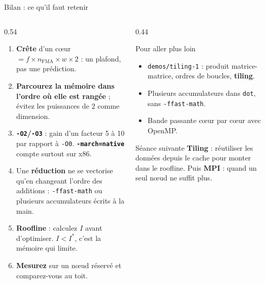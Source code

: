 \documentclass[8pt,aspectratio=169]{beamer}
\begin{document}
\begin{frame}{Bilan : ce qu'il faut retenir}
\begin{columns}[T]
\begin{column}{0.54\textwidth}
\begin{enumerate}
\item \textbf{Crête} d'un cœur $= f \times n_{\text{FMA}} \times w \times 2$ : un plafond, pas une prédiction.
\item \textbf{Parcourez la mémoire dans l'ordre où elle est rangée} ; évitez les puissances de 2 comme dimension.
\item \textbf{\texttt{-O2}/\texttt{-O3}} : gain d'un facteur 5 à 10 par rapport à \texttt{-O0}. \textbf{\texttt{-march=native}} compte surtout sur x86.
\item Une \textbf{réduction} ne se vectorise qu'en changeant l'ordre des additions : \texttt{-ffast-math} ou plusieurs accumulateurs écrits à la main.
\item \textbf{Roofline} : calculez $I$ avant d'optimiser. $I<I^*$, c'est la mémoire qui limite.
\item \textbf{Mesurez} sur un nœud réservé et comparez-vous au toit.
\end{enumerate}
\end{column}
\begin{column}{0.44\textwidth}
\begin{block}{Pour aller plus loin}
\begin{itemize}
\item \texttt{demos/tiling-1} : produit matrice-matrice, ordres de boucles, \textbf{tiling}.
\item Plusieurs accumulateurs dans \texttt{dot}, sans \texttt{-ffast-math}.
\item Bande passante cœur par cœur avec OpenMP.
\end{itemize}
\end{block}
\begin{exampleblock}{Séance suivante}
\textbf{Tiling} : réutiliser les données depuis le cache pour monter dans le roofline. Puis \textbf{MPI} : quand un seul nœud ne suffit plus.
\end{exampleblock}
\end{column}
\end{columns}
\end{frame}
\end{document}
